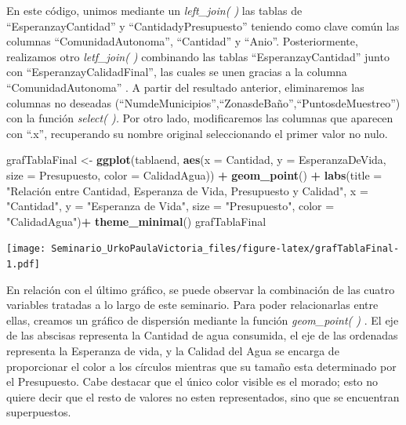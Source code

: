 \documentclass[
]{article}
\newenvironment{Shaded}{\begin{snugshade}}{\end{snugshade}}
\newcommand{\AttributeTok}[1]{\textcolor[rgb]{0.13,0.29,0.53}{#1}}
\newcommand{\FunctionTok}[1]{\textcolor[rgb]{0.13,0.29,0.53}{\textbf{#1}}}
\newcommand{\NormalTok}[1]{#1}
\newcommand{\OtherTok}[1]{\textcolor[rgb]{0.56,0.35,0.01}{#1}}
\newcommand{\SpecialCharTok}[1]{\textcolor[rgb]{0.81,0.36,0.00}{\textbf{#1}}}
\newcommand{\StringTok}[1]{\textcolor[rgb]{0.31,0.60,0.02}{#1}}
\begin{document}
En este código, unimos mediante un \emph{left\_join( )} las tablas de
``EsperanzayCantidad'' y ``CantidadyPresupuesto'' teniendo como clave
común las columnas ``ComunidadAutonoma'', ``Cantidad'' y ``Anio''.
Posteriormente, realizamos otro \emph{letf\_join( )} combinando las
tablas ``EsperanzayCantidad'' junto con ``EsperanzayCalidadFinal'', las
cuales se unen gracias a la columna ``ComunidadAutonoma'' . A partir del
resultado anterior, eliminaremos las columnas no deseadas
(``NumdeMunicipios'',``ZonasdeBaño'',``PuntosdeMuestreo'') con la
función \emph{select( ).} Por otro lado, modificaremos las columnas que
aparecen con ``.x'', recuperando su nombre original seleccionando el
primer valor no nulo.

\begin{Shaded}
\begin{Highlighting}[]
\NormalTok{grafTablaFinal }\OtherTok{\textless{}{-}} \FunctionTok{ggplot}\NormalTok{(tablaend, }\FunctionTok{aes}\NormalTok{(}\AttributeTok{x =}\NormalTok{ Cantidad, }\AttributeTok{y =}\NormalTok{ EsperanzaDeVida, }\AttributeTok{size =}\NormalTok{ Presupuesto, }\AttributeTok{color =}\NormalTok{ CalidadAgua)) }\SpecialCharTok{+}
  \FunctionTok{geom\_point}\NormalTok{() }\SpecialCharTok{+}
  \FunctionTok{labs}\NormalTok{(}\AttributeTok{title =} \StringTok{"Relación entre Cantidad, Esperanza de Vida, Presupuesto y Calidad"}\NormalTok{,      }\AttributeTok{x =} \StringTok{"Cantidad"}\NormalTok{,}
       \AttributeTok{y =} \StringTok{"Esperanza de Vida"}\NormalTok{,}
       \AttributeTok{size =} \StringTok{"Presupuesto"}\NormalTok{,}
       \AttributeTok{color =} \StringTok{"CalidadAgua"}\NormalTok{)}\SpecialCharTok{+}
      \FunctionTok{theme\_minimal}\NormalTok{()}
\NormalTok{grafTablaFinal}
\end{Highlighting}
\end{Shaded}

\texttt{[image: Seminario\_UrkoPaulaVictoria\_files/figure-latex/grafTablaFinal-1.pdf]}

En relación con el último gráfico, se puede observar la combinación de
las cuatro variables tratadas a lo largo de este seminario. Para poder
relacionarlas entre ellas, creamos un gráfico de dispersión mediante la
función \emph{geom\_point( )} . El eje de las abscisas representa la
Cantidad de agua consumida, el eje de las ordenadas representa la
Esperanza de vida, y la Calidad del Agua se encarga de proporcionar el
color a los círculos mientras que su tamaño esta determinado por el
Presupuesto. Cabe destacar que el único color visible es el morado; esto
no quiere decir que el resto de valores no esten representados, sino que
se encuentran superpuestos.
\end{document}
